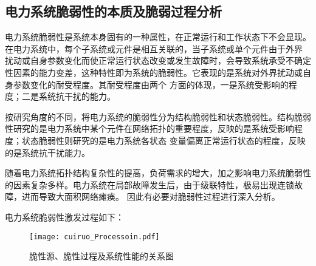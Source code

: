 


\subsection{电力系统脆弱性的本质及脆弱过程分析}
\label{sec:network}

电力系统脆弱性是系统本身固有的一种属性，在正常运行和工作状态下不会显现。在电力系统中，每个子系统或元件是相互关联的，当子系统或单个元件由于外界
扰动或自身参数变化而使正常运行状态改变或发生故障时，会导致系统承受不确定性因素的能力变差，这种特性即为系统的脆弱性。它表现的是系统对外界扰动或自身参数变化的耐受程度。其耐受程度由两个
方面的体现，一是系统受影响的程度；二是系统抗干扰的能力。


按研究角度的不同，将电力系统的脆弱性分为结构脆弱性和状态脆弱性。结构脆弱性研究的是电力系统中某个元件在网络拓扑的重要程度，反映的是系统受影响程度；状态脆弱性则研究的是电力系统各状态
变量偏离正常运行状态的程度，反映的是系统抗干扰能力。

随着电力系统拓扑结构复杂性的提高，负荷需求的增大，加之影响电力系统脆弱性的因素复杂多样。电力系统在局部故障发生后，由于级联特性，极易出现连锁故障，进而导致大面积网络瘫痪。
因此有必要对脆弱性过程进行深入分析。

电力系统脆弱性激发过程如下：
\begin{figure}[H] %
  \centering
  \texttt{[image: cuiruo\_Processoin.pdf]}
  \caption{脆性源、脆性过程及系统性能的关系图}
  \label{fig:procession}
\end{figure}


